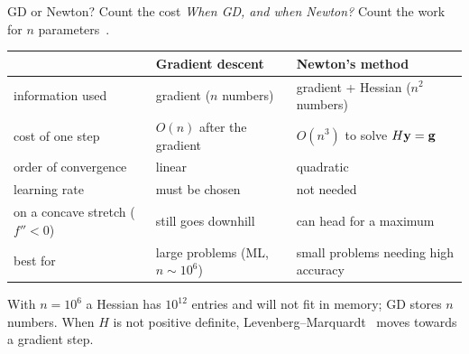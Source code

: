 \begin{frame}{GD or Newton? Count the cost}
  \small
  \emph{When GD, and when Newton?} Count the work for $n$ parameters~\cite{nocedal2006}.

  \vspace{2pt}
  \centering\footnotesize
  \begin{tabular}{@{}l l l@{}}
    \toprule
    & Gradient descent & Newton's method \\
    \midrule
    information used & gradient ($n$ numbers) & gradient + Hessian ($n^2$ numbers) \\
    cost of one step & $O(n)$ after the gradient & $O(n^3)$ to solve $H\mathbf y = \mathbf{g}$ \\
    order of convergence & linear & quadratic \\
    learning rate & must be chosen & not needed \\
    on a concave stretch ($f'' < 0$) & still goes downhill & can head for a \textcolor{mRed}{maximum} \\
    best for & large problems (ML, $n\sim10^6$) & small problems needing high accuracy \\
    \bottomrule
  \end{tabular}

  \raggedright
  \vspace{3pt}
  \begin{keybox}
    \footnotesize With $n = 10^6$ a Hessian has $10^{12}$ entries and will not fit in memory; GD stores $n$ numbers.
    When $H$ is not positive definite, Levenberg--Marquardt~\cite{nocedal2006} moves towards a gradient step.
  \end{keybox}
\end{frame}
